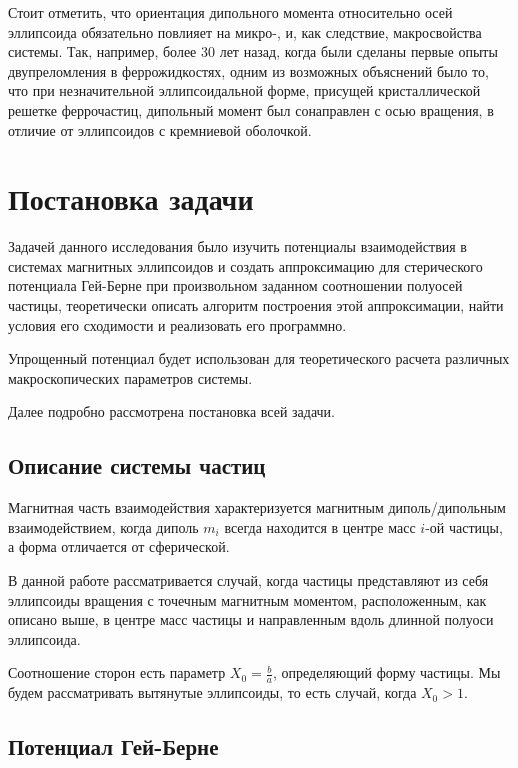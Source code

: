 \documentclass[a4paper,14pt]{extarticle}
\begin{document}
    Стоит отметить, что ориентация дипольного момента относительно осей эллипсоида обязательно повлияет на микро-, и, как следствие, макросвойства системы. Так, например, более 30 лет назад, когда были сделаны первые опыты двупреломления в феррожидкостях, одним из возможных объяснений было то, что при незначительной эллипсоидальной форме, присущей кристаллической решетке феррочастиц, дипольный момент был сонаправлен с осью вращения, в отличие от эллипсоидов с кремниевой оболочкой.

    \newpage

    \section{Постановка задачи}

    Задачей данного исследования было изучить потенциалы
    взаимодействия в системах магнитных эллипсоидов и
    создать аппроксимацию для стерического потенциала
    Гей-Берне при произвольном заданном соотношении
    полуосей частицы, теоретически описать алгоритм
    построения этой аппроксимации, найти условия его сходимости
    и реализовать его программно.

    Упрощенный потенциал будет использован для
    теоретического расчета различных макроскопических
    параметров системы.

    Далее подробно рассмотрена постановка всей задачи.

    \subsection{Описание системы частиц}

    Магнитная часть взаимодействия характеризуется магнитным диполь\-/дипольным взаимодействием, когда диполь $m_i$ всегда находится в центре масс $i$-ой частицы, а форма отличается от сферической.

    В данной работе рассматривается случай, когда частицы представляют из себя эллипсоиды вращения с точечным магнитным моментом, расположенным, как описано выше, в центре масс частицы и направленным вдоль длинной полуоси эллипсоида.

    Соотношение сторон есть параметр $X_0 = \frac{b}{a}$, определяющий форму частицы. Мы будем рассматривать вытянутые эллипсоиды, то есть случай, когда $X_0 > 1$.

    \subsection{Потенциал Гей-Берне}
\end{document}
